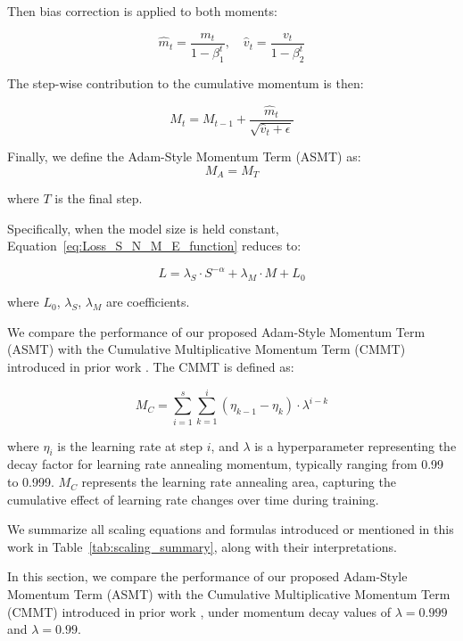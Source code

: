 \documentclass[letterpaper]{article} %
\begin{document}
Then bias correction is applied to both moments:

\begin{equation}
	\hat{m}_t = \frac{m_t}{1 - \beta_1^t}, \quad \hat{v}_t = \frac{v_t}{1 - \beta_2^t}
	\label{eq:m_t_v_t_correction}
\end{equation}

The step-wise contribution to the cumulative momentum is then:

\begin{equation}
	M_t = M_{t-1} + \frac{\hat{m}_t}{\sqrt{\hat{v}_t + \epsilon}}
	\label{eq:cumulative_momentum}
\end{equation}

Finally, we define the Adam-Style Momentum Term (ASMT) as:
\begin{equation}
	M_A = M_{T}
	\label{eq:ASTM}
\end{equation}

\noindent where \(T\) is the final step.

Specifically, when the model size is held constant, Equation~\ref{eq:Loss_S_N_M_E_function} reduces to:

\begin{equation}
	L = \lambda_S \cdot S^{-\alpha} + \lambda_M \cdot M + L_0
	\label{eq:Loss_S_M_function}
\end{equation}

\noindent where $L_0$, $\lambda_S$, $\lambda_M$ are coefficients.

We compare the performance of our proposed Adam-Style Momentum Term (ASMT) with the Cumulative Multiplicative Momentum Term (CMMT) introduced in prior work \citep{tissue2024scaling}. The CMMT is defined as:

\begin{equation}
	M_{C} = \sum_{i=1}^{s} \sum_{k=1}^{i} (\eta_{k-1} - \eta_k) \cdot \lambda^{i-k}
\end{equation}

\noindent where \( \eta_i \) is the learning rate at step \( i \), and \( \lambda \) is a hyperparameter representing the decay factor for learning rate annealing momentum, typically ranging from 0.99 to 0.999. \( M_{C} \) represents the learning rate annealing area, capturing the cumulative effect of learning rate changes over time during training.

We summarize all scaling equations and formulas introduced or mentioned in this work in Table~\ref{tab:scaling_summary}, along with their interpretations.

In this section, we compare the performance of our proposed Adam-Style Momentum Term (ASMT) with the Cumulative Multiplicative Momentum Term (CMMT) introduced in prior work \citep{tissue2024scaling}, under momentum decay values of $\lambda = 0.999$ and $\lambda = 0.99$.
\end{document}
